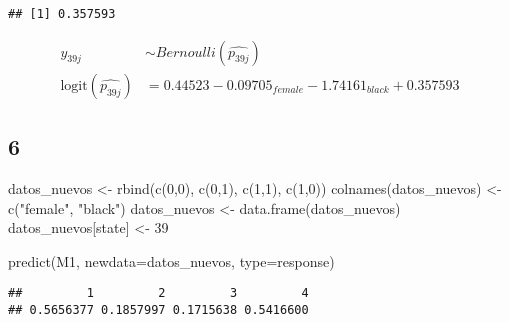 \documentclass[
]{article}
\newenvironment{Shaded}{\begin{snugshade}}{\end{snugshade}}
\newcommand{\AttributeTok}[1]{\textcolor[rgb]{0.77,0.63,0.00}{#1}}
\newcommand{\DecValTok}[1]{\textcolor[rgb]{0.00,0.00,0.81}{#1}}
\newcommand{\FunctionTok}[1]{\textcolor[rgb]{0.00,0.00,0.00}{#1}}
\newcommand{\NormalTok}[1]{#1}
\newcommand{\OtherTok}[1]{\textcolor[rgb]{0.56,0.35,0.01}{#1}}
\newcommand{\StringTok}[1]{\textcolor[rgb]{0.31,0.60,0.02}{#1}}
\begin{document}
\begin{verbatim}
## [1] 0.357593
\end{verbatim}

\begin{align} 
y_{39j} & \sim  Bernoulli(\hat{p_{39j}}) \\ 
\text{logit}(\hat{p_{39j}}) &= 0.44523 -0.09705_{female} -1.74161_{black}  + 0.357593
\end{align}

\hypertarget{section-4}{%
\subsection{6}\label{section-4}}

\begin{Shaded}
\begin{Highlighting}[]
\NormalTok{datos\_nuevos }\OtherTok{\textless{}{-}} \FunctionTok{rbind}\NormalTok{(}\FunctionTok{c}\NormalTok{(}\DecValTok{0}\NormalTok{,}\DecValTok{0}\NormalTok{),}
                      \FunctionTok{c}\NormalTok{(}\DecValTok{0}\NormalTok{,}\DecValTok{1}\NormalTok{),}
                      \FunctionTok{c}\NormalTok{(}\DecValTok{1}\NormalTok{,}\DecValTok{1}\NormalTok{),}
                      \FunctionTok{c}\NormalTok{(}\DecValTok{1}\NormalTok{,}\DecValTok{0}\NormalTok{))}
\FunctionTok{colnames}\NormalTok{(datos\_nuevos) }\OtherTok{\textless{}{-}} \FunctionTok{c}\NormalTok{(}\StringTok{"female"}\NormalTok{, }\StringTok{"black"}\NormalTok{)}
\NormalTok{datos\_nuevos }\OtherTok{\textless{}{-}} \FunctionTok{data.frame}\NormalTok{(datos\_nuevos)}
\NormalTok{datos\_nuevos[}\StringTok{\textquotesingle{}state\textquotesingle{}}\NormalTok{] }\OtherTok{\textless{}{-}} \DecValTok{39}

\FunctionTok{predict}\NormalTok{(M1, }\AttributeTok{newdata=}\NormalTok{datos\_nuevos, }\AttributeTok{type=}\StringTok{\textquotesingle{}response\textquotesingle{}}\NormalTok{)}
\end{Highlighting}
\end{Shaded}

\begin{verbatim}
##         1         2         3         4 
## 0.5656377 0.1857997 0.1715638 0.5416600
\end{verbatim}
\end{document}
